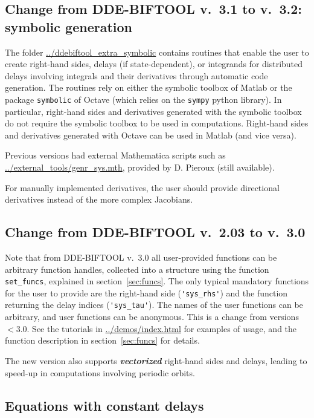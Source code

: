 \documentclass[10pt]{scrartcl}
\newcommand{\DDEBIFCODE}{\textsc{DDE-BIFTOOL}}
\newcommand{\demobase}{\url{../demos/index.html}}
\newcommand{\blist}[1]{\mbox{\lstinline!#1!}}
\begin{document}
\subsection{Change from \DDEBIFCODE{} v.~3.1 to v.~3.2: symbolic generation}
\label{sec:symbolic}
The folder \url{../ddebiftool_extra_symbolic} contains routines that
enable the user to create right-hand sides, delays (if
state-dependent), or integrands for distributed delays involving
integrals and their derivatives through automatic code generation. The
routines rely on either the symbolic toolbox of Matlab or the package
\texttt{symbolic} of Octave (which relies on the \texttt{sympy} python
library). In particular, right-hand sides and derivatives generated
with the symbolic toolbox do not require the symbolic toolbox to be
used in computations. Right-hand sides and derivatives generated with
Octave can be used in Matlab (and vice versa).

Previous versions had external Mathematica scripts such as
\url{../external_tools/genr_sys.mth}, provided by D. Pieroux (still available).

For manually implemented derivatives, the user should provide
directional derivatives instead of the more complex Jacobians.
\subsection{Change from \DDEBIFCODE{} v.~2.03 to
  v.~3.0} Note that from \DDEBIFCODE{} v.~3.0 all
user-provided functions can be arbitrary function handles, collected
into a structure using the function \blist{set_funcs}, explained in
section~\ref{sec:funcs}. The only typical mandatory functions for the
user to provide are the right-hand side (\blist{'sys_rhs'}) and the
function returning the delay indices (\blist{'sys_tau'}). The names of
the user functions can be arbitrary, and user functions can be
anonymous. This is a change from versions $<3.0$. See the tutorials
in \demobase{} for examples of usage, and the function description in
section~\ref{sec:funcs} for details.

The new version also supports \textbf{\emph{vectorized}} right-hand
sides and delays, leading to speed-up in computations involving periodic orbits.
\subsection{Equations with constant delays}\label{sys_def1}
\end{document}
